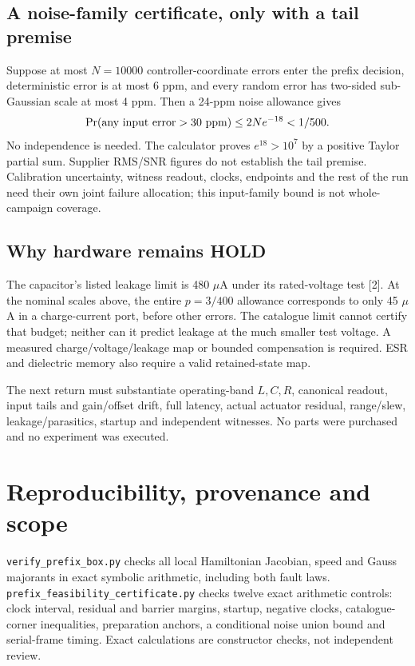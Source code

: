 \documentclass[10pt,a4paper]{article}
\begin{document}
\subsection*{A noise-family certificate, only with a tail premise}
Suppose at most $N=10000$ controller-coordinate errors enter the prefix decision, deterministic error is at most 6 ppm, and every random error has two-sided sub-Gaussian scale at most 4 ppm. Then a 24-ppm noise allowance gives
\begin{equation}
\Pr(\text{any input error}>30\ {\rm ppm})
\leq 2N e^{-18}<1/500 .
\end{equation}
No independence is needed. The calculator proves $e^{18}>10^7$ by a positive Taylor partial sum. Supplier RMS/SNR figures do not establish the tail premise. Calibration uncertainty, witness readout, clocks, endpoints and the rest of the run need their own joint failure allocation; this input-family bound is not whole-campaign coverage.

\subsection*{Why hardware remains HOLD}
The capacitor's listed leakage limit is 480 $\mu$A under its rated-voltage test [2]. At the nominal scales above, the entire $p=3/400$ allowance corresponds to only 45 $\mu$A in a charge-current port, before other errors. The catalogue limit cannot certify that budget; neither can it predict leakage at the much smaller test voltage. A measured charge/voltage/leakage map or bounded compensation is required. ESR and dielectric memory also require a valid retained-state map.

The next return must substantiate operating-band $L,C,R$, canonical readout, input tails and gain/offset drift, full latency, actual actuator residual, range/slew, leakage/parasitics, startup and independent witnesses. No parts were purchased and no experiment was executed.
\newpage
\section{Reproducibility, provenance and scope}
\texttt{verify\_prefix\_box.py} checks all local Hamiltonian Jacobian, speed and Gauss majorants in exact symbolic arithmetic, including both fault laws. \texttt{prefix\_feasibility\_certificate.py} checks twelve exact arithmetic controls: clock interval, residual and barrier margins, startup, negative clocks, catalogue-corner inequalities, preparation anchors, a conditional noise union bound and serial-frame timing. Exact calculations are constructor checks, not independent review.
\end{document}
